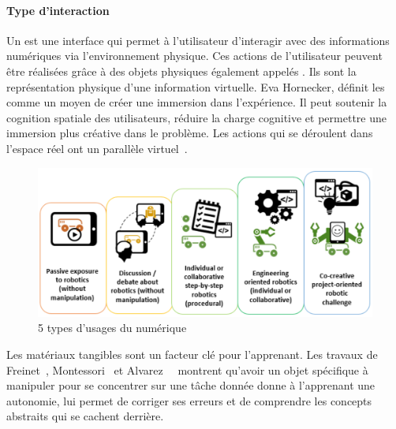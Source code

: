     \paragraph{Type d'interaction}
        Un  est une interface qui permet à l'utilisateur d'interagir avec des informations numériques via l'environnement physique. Ces actions de l'utilisateur peuvent être réalisées grâce à des objets physiques également appelés . Ils sont la représentation physique d'une information virtuelle. Eva Hornecker, 
        définit les  comme un moyen de créer une immersion dans l'expérience. Il peut soutenir la cognition spatiale des utilisateurs, réduire la charge cognitive et permettre une immersion plus créative dans le problème. Les actions qui se déroulent dans l'espace réel ont un parallèle virtuel~.
        \begin{figure}[!h]
            \centering
            \label{fig:type_interac}\includegraphics[width=\linewidth]{Figures/Romero-type_of_interac.png}
            \caption{5 types d'usages du numérique }
        \end{figure}\par%
        Les matériaux tangibles sont un facteur clé pour l'apprenant. Les travaux de Freinet~, Montessori~ et Alvarez~~ montrent qu'avoir un objet spécifique à manipuler pour se concentrer sur une tâche donnée donne à l'apprenant une autonomie, lui permet de corriger ses erreurs et de comprendre les concepts abstraits qui se cachent derrière. 
